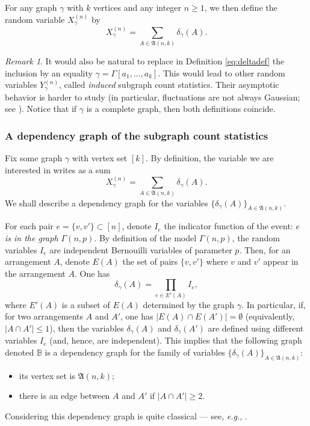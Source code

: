 \documentclass[12pt,a4paper,reqno]{amsart}
\theoremstyle{remark}
\newtheorem{remark}[lemma]{Remark}
\newcommand{\SubGraph}{X^{(n)}}
\newcommand{\arr}{\mathfrak{A}}
\def\B{\mathbb{B}}
\begin{document}
\noindent For any graph $\gamma$ with $k$ vertices
and any integer $n \ge 1$, we then define the random variable $\SubGraph_{\gamma}$ by
$$\SubGraph_{\gamma} = \sum_{A \in \arr(n,k)} \delta_\gamma(A).$$

\begin{remark}
It would also be natural to replace in Definition \eqref{eq:deltadef} the inclusion by an equality $\gamma = \Gamma[a_1,\dots,a_k]$. This would lead to other random variables $Y_\gamma^{(n)}$, called {\em induced} subgraph count statistics. Their asymptotic behavior is harder to study (in particular, fluctuations are not always Gaussian; see \cite[Theorem 6.52]{JLR00}). Notice that if $\gamma$ is a complete graph, then both definitions coincide.
\end{remark}\medskip


\subsubsection{A dependency graph of the subgraph count statistics}
Fix some graph $\gamma$ with vertex set $[k]$. By definition, the variable we are interested in writes as a sum
$$\SubGraph_{\gamma} = \sum_{A \in \arr(n,k)} \delta_\gamma(A).$$
We shall describe a dependency graph for the variables $\{\delta_\gamma(A)\}_{A \in \arr(n,k)}$.\bigskip

For each pair $e=\{v,v'\} \subset [n]$, denote $I_e$ the indicator function of the event: {\em $e$ is in the graph $\Gamma(n,p)$}. By definition of the model $\Gamma(n,p)$, the random variables $I_e$ are independent Bernouilli variables of parameter $p$. Then, for an arrangement $A$, denote $E(A)$ the set of pairs $\{v,v'\}$ where $v$ and $v'$ appear in the arrangement $A$. One has
\[\delta_\gamma(A) = \prod_{e \in E'(A)} I_e, \]
where $E'(A)$ is a subset of $E(A)$ determined by the graph $\gamma$. In particular, if, for two arrangements $A$ and $A'$, one has $|E(A) \cap E(A')| =\emptyset$ (equivalently, $|A \cap A'| \le 1$), then the variables $\delta_\gamma(A)$ and $\delta_\gamma(A')$ are defined using different variables $I_e$ (and, hence, are independent). This implies that the following graph denoted $\B$ is a dependency graph for the family of variables $\{\delta_\gamma(A)\}_{A \in \arr(n,k)}$:\vspace{2mm}
\begin{itemize}
    \item its vertex set is $\arr(n,k)$;\vspace{2mm}
    \item there is an edge between $A$ and $A'$ if  $|A \cap A'| \ge 2$.\vspace{2mm}
\end{itemize}
Considering this dependency graph is quite classical --- see, {\em e.g.}, \cite[Example 1.6]{JLR00}.\bigskip
\end{document}
